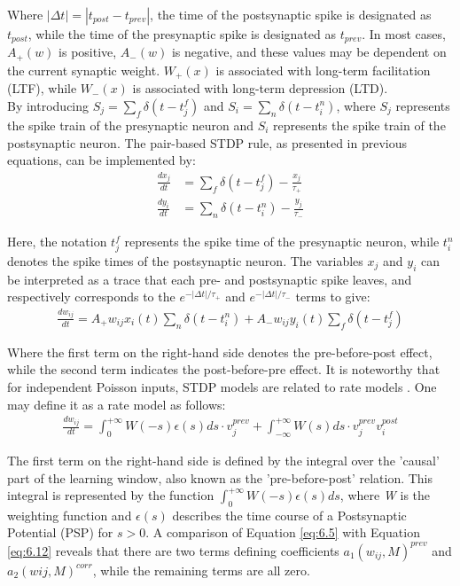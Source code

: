 \noindent Where $\left| \Delta t \right| = \left| t_{post} - t_{prev} \right|$, the time of the postsynaptic spike is designated as $t_{post}$, while the time of the presynaptic spike is designated as $t_{prev}$. In most cases, $A_+(w)$ is positive, $A_-(w)$ is negative, and these values may be dependent on the current synaptic weight. $W_+ (x)$ is associated with long-term facilitation (LTF), while $W_- (x)$ is associated with long-term depression (LTD). \\

\noindent By introducing $S_j = \sum_{f}^{} \delta\left( t - t_j^f \right) $ and $S_i = \sum_{n}^{} \delta\left( t - t_i^n \right) $,  where $S_j$ represents the spike train of the presynaptic neuron and $S_i$ represents the spike train of the postsynaptic neuron. The pair-based STDP rule, as presented in previous equations, can be implemented by:
\begin{align}
\frac{dx_j}{dt} &= \sum_{f}^{}\delta\left( t - t_j^f \right) - \frac{x_j}{\tau_+} \label{eq:6.9} \\
\frac{dy_i}{dt} &= \sum_{n}^{}\delta\left( t - t_i^n \right) - \frac{y_j}{\tau_-} \label{eq:6.10} 
\end{align}

\noindent Here, the notation $t_j^f$ represents the spike time of the presynaptic neuron, while $t_i^n$ denotes the spike times of the postsynaptic neuron. The variables $x_j$ and $y_i$ can be interpreted as a trace that each pre- and postsynaptic spike leaves, and respectively corresponds to the $e^{-\left| \Delta t \right| / \tau_+} $ and $e^{-\left| \Delta t \right| / \tau_-}$ terms to give:
\begin{align}
\frac{dw_{ij}}{dt} = A_+ w_{ij}x_i(t) \sum_{n}\delta\left( t - t_i^n \right) + A_-w_{ij}y_i(t)\sum_{f}\delta\left( t - t_j^f \right) \label{eq:6.11} 
\end{align}

\noindent Where the first term on the right-hand side denotes the pre-before-post effect, while the second term indicates the post-before-pre effect. It is noteworthy that for independent Poisson inputs, STDP models are related to rate models \cite{gerstner2014neuronal}. One may define it as a rate model as follows:
\begin{align}
\frac{dw_{ij}}{dt} = \int_{0}^{+\infty } W(-s)\epsilon(s)ds\cdot v_{j}^{prev} + \int_{-\infty }^{+\infty } W(s)ds \cdot v_j^{prev}v_i^{post} \label{eq:6.12}
\end{align}


\noindent The first term on the right-hand side is defined by the integral over the 'causal' part of the learning window, also known as the 'pre-before-post' relation. This integral is represented by the function $\int_{0}^{+\infty } W(-s)\epsilon(s)ds$, where \textit{W} is the weighting function and $\epsilon (s)$ describes the time course of a Postsynaptic Potential (PSP) for $s > 0$. A comparison of Equation \ref{eq:6.5} with Equation \ref{eq:6.12} reveals that there are two terms defining coefficients $a_1(w_{ij},M)^{prev}$ and $a_2(wij,M)^{corr}$, while the remaining terms are all zero. \\

